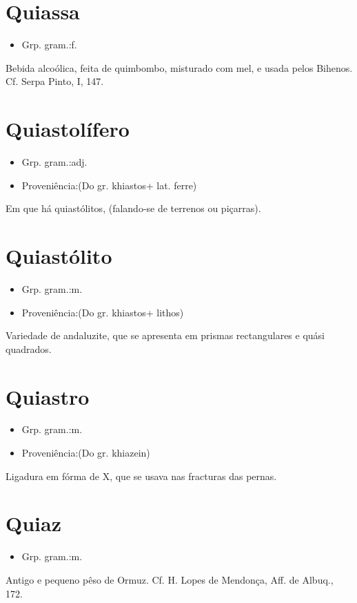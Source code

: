 \section{Quiassa}
\begin{itemize}
\item {Grp. gram.:f.}
\end{itemize}
Bebida alcoólica, feita de quimbombo, misturado com mel, e usada pelos Bihenos. Cf. Serpa Pinto, I, 147.
\section{Quiastolífero}
\begin{itemize}
\item {Grp. gram.:adj.}
\end{itemize}
\begin{itemize}
\item {Proveniência:(Do gr. \textunderscore khiastos\textunderscore  + lat. \textunderscore ferre\textunderscore )}
\end{itemize}
Em que há quiastólitos, (falando-se de terrenos ou piçarras).
\section{Quiastólito}
\begin{itemize}
\item {Grp. gram.:m.}
\end{itemize}
\begin{itemize}
\item {Proveniência:(Do gr. \textunderscore khiastos\textunderscore  + \textunderscore lithos\textunderscore )}
\end{itemize}
Variedade de andaluzite, que se apresenta em prismas rectangulares e quási quadrados.
\section{Quiastro}
\begin{itemize}
\item {Grp. gram.:m.}
\end{itemize}
\begin{itemize}
\item {Proveniência:(Do gr. \textunderscore khiazein\textunderscore )}
\end{itemize}
Ligadura em fórma de X, que se usava nas fracturas das pernas.
\section{Quiaz}
\begin{itemize}
\item {Grp. gram.:m.}
\end{itemize}
Antigo e pequeno pêso de Ormuz. Cf. H. Lopes de Mendonça, \textunderscore Aff. de Albuq.\textunderscore , 172.
